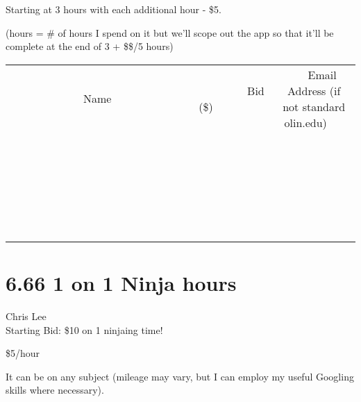 \documentclass[11pt]{article}
\begin{document}
Starting at 3 hours with each additional hour - \$5. 

(hours = \# of hours I spend on it but we'll scope out the app so that it'll be complete at the end of 3 + \$\$/5 hours)
\\[6ex]
\begin{tabular}{c c c}
~~~~~~~~~~~~~Name~~~~~~~~~~~~~ & ~~~~~~~~~Bid (\$)~~~~~~~~~  & ~~~Email Address (if not standard olin.edu)~~~\\
 & & \\
\hline
 & & \\
\hline
 & & \\
\hline
 & & \\
\hline
 & & \\
\hline
 & & \\
\hline
 & & \\
\hline
 & & \\
\hline
 & & \\
\hline
 & & \\
\hline
 & & \\
\hline
 & & \\
\hline
 & & \\
\hline
 & & \\
\hline
 & & \\
\hline
 & & \\
\hline
 & & \\
\hline
 & & \\
\hline
 & & \\
\hline
 & & \\
\hline
 & & \\
\hline
 & & \\
\hline
 & & \\
\hline
 & & \\
\hline
 & & \\
\hline
 & & \\
\hline
\end{tabular}
\newpage
\section*{6.66 1 on 1 Ninja hours}
Chris Lee
\\
Starting Bid: \$10
 on 1 ninjaing time! 

\$5/hour

It can be on any subject (mileage may vary, but I can employ my useful Googling skills where necessary). 
\end{document}
